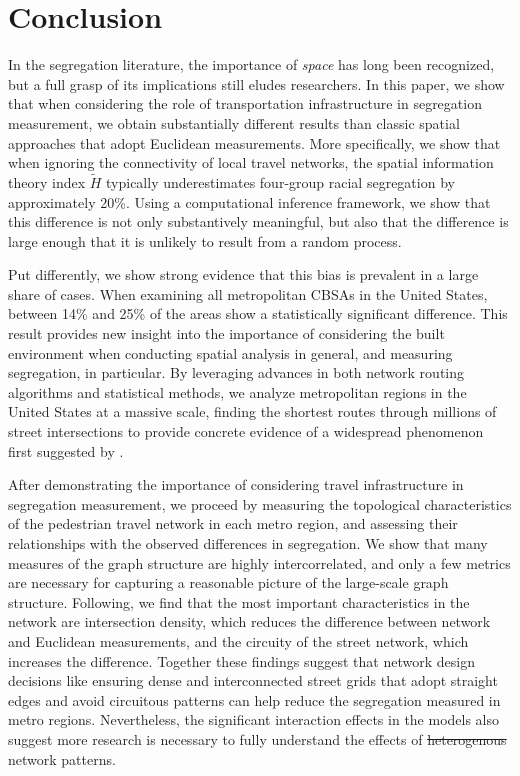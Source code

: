 \documentclass[
  10pt,
]{article}
\providecommand{\DIFaddtex}[1]{{\protect\color{blue}\uwave{#1}}} %
\providecommand{\DIFdeltex}[1]{{\protect\color{red}\sout{#1}}}                      %
\providecommand{\DIFaddbegin}{} %
\providecommand{\DIFaddend}{} %
\providecommand{\DIFdelbegin}{} %
\providecommand{\DIFdelend}{} %
\providecommand{\DIFadd}[1]{\texorpdfstring{\DIFaddtex{#1}}{#1}} %
\providecommand{\DIFdel}[1]{\texorpdfstring{\DIFdeltex{#1}}{}} %
\newcommand{\DIFscaledelfig}{0.5}
\newlength{\DIFdelgraphicswidth} %
\newlength{\DIFdelgraphicsheight} %
\newcommand{\DIFaddincludegraphics}[2][]{{\color{blue}\fbox{\DIFOincludegraphics[#1]{#2}}}} %
\newcommand{\DIFdelincludegraphics}[2][]{%
\sbox{\DIFdelgraphicsbox}{\DIFOincludegraphics[#1]{#2}}%
\settoboxwidth{\DIFdelgraphicswidth}{\DIFdelgraphicsbox} %
\settoboxtotalheight{\DIFdelgraphicsheight}{\DIFdelgraphicsbox} %
\scalebox{\DIFscaledelfig}{%
\parbox[b]{\DIFdelgraphicswidth}{\usebox{\DIFdelgraphicsbox}\\[-\baselineskip] \rule{\DIFdelgraphicswidth}{0em}}\llap{\resizebox{\DIFdelgraphicswidth}{\DIFdelgraphicsheight}{%
\setlength{\unitlength}{\DIFdelgraphicswidth}%
\begin{picture}(1,1)%
\thicklines\linethickness{2pt} %
{\color[rgb]{1,0,0}\put(0,0){\framebox(1,1){}}}%
{\color[rgb]{1,0,0}\put(0,0){\line( 1,1){1}}}%
{\color[rgb]{1,0,0}\put(0,1){\line(1,-1){1}}}%
\end{picture}%
}\hspace*{3pt}}} %
} %
\DeclareRobustCommand{\DIFaddbegin}{\DIFOaddbegin \let\includegraphics\DIFaddincludegraphics} %
\DeclareRobustCommand{\DIFaddend}{\DIFOaddend \let\includegraphics\DIFOincludegraphics} %
\DeclareRobustCommand{\DIFdelbegin}{\DIFOdelbegin \let\includegraphics\DIFdelincludegraphics} %
\DeclareRobustCommand{\DIFdelend}{\DIFOaddend \let\includegraphics\DIFOincludegraphics} %
\begin{document}
\hypertarget{conclusion}{%
\section{Conclusion}\label{conclusion}}

In the segregation literature, the importance of \emph{space} has long
been recognized, but a full grasp of its implications still eludes
researchers. In this paper, we show that when considering the role of
transportation infrastructure in segregation measurement, we obtain
substantially different results than classic spatial approaches that
adopt Euclidean measurements. More specifically, we show that when
ignoring the connectivity of local travel networks, the spatial
information theory index \(\tilde{H}\) typically underestimates
four-group racial segregation by approximately 20\%. Using a
computational inference framework, we show that this difference is not
only substantively meaningful, but also that the difference is large
enough that it is unlikely to result from a random process.
\DIFaddbegin 

\DIFaddend Put differently, we show strong evidence that this bias is prevalent in
a large share of cases. When examining all metropolitan CBSAs in the
United States, between 14\% and 25\% of the areas show a statistically
significant difference. This result provides new insight into the
importance of considering the built environment when conducting spatial
analysis in general, and measuring segregation, in particular. By
leveraging advances in both network routing algorithms and statistical
methods, we analyze metropolitan regions in the United States at a
massive scale, finding the shortest routes through millions of street
intersections to provide concrete evidence of a widespread phenomenon
first suggested by \citet{roberto2018SpatialProximity}.

After demonstrating the importance of considering travel infrastructure
in segregation measurement, we proceed by measuring the topological
characteristics of the pedestrian travel network in each metro region,
and assessing their relationships with the observed differences in
segregation. We show that many measures of the graph structure are
highly intercorrelated, and only a few metrics are necessary for
capturing a reasonable picture of the large-scale graph structure.
Following, we find that the most important characteristics in the
network are intersection density, which reduces the difference between
network and Euclidean measurements, and the circuity of the street
network, which increases the difference. Together these findings suggest
that network design decisions like ensuring dense and interconnected
street grids that adopt straight edges and avoid circuitous patterns can
help reduce the segregation measured in metro regions. Nevertheless, the
significant interaction effects in the models also suggest more research
is necessary to fully understand the effects of \DIFdelbegin \DIFdel{heterogenous }\DIFdelend \DIFaddbegin \DIFadd{heterogeneous }\DIFaddend network
patterns.
\end{document}
